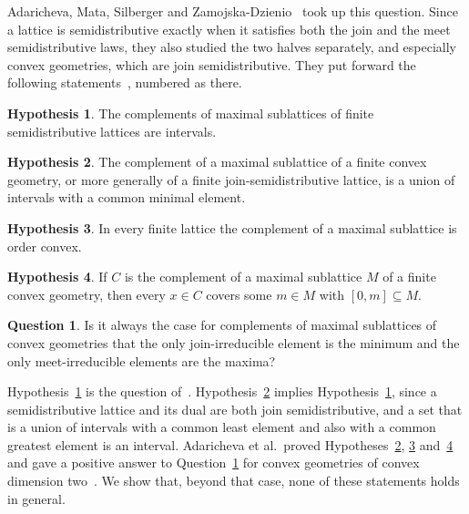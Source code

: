 \documentclass[11pt]{amsart}
\theoremstyle{definition}
\newtheorem{hypothesis}{Hypothesis}
\newtheorem{question}{Question}
\theoremstyle{remark}
\numberwithin{equation}{section}
\begin{document}
Adaricheva, Mata, Silberger and Zamojska-Dzienio~\cite{AMSZ} took up this question. Since a lattice is semidistributive exactly when it satisfies both the join and the meet semidistributive laws, they also studied the two halves separately, and especially convex geometries, which are join semidistributive. They put forward the following statements~\cite[pp.~2--4 and~25]{AMSZ}, numbered as there.

\begin{hypothesis}\label{h1}
The complements of maximal sublattices of finite semidistributive lattices are intervals.
\end{hypothesis}

\begin{hypothesis}\label{h2}
The complement of a maximal sublattice of a finite convex geometry, or more generally of a finite join-semidistributive lattice, is a union of intervals with a common minimal element.
\end{hypothesis}

\begin{hypothesis}\label{h3}
In every finite lattice the complement of a maximal sublattice is order convex.
\end{hypothesis}

\begin{hypothesis}\label{h4}
If $C$ is the complement of a maximal sublattice $M$ of a finite convex geometry, then every $x\in C$ covers some $m\in M$ with $[0,m]\subseteq M$.
\end{hypothesis}

\setcounter{question}{1}%
\begin{question}\label{q2}
Is it always the case for complements of maximal sublattices of convex geometries that the only join-irreducible element is the minimum and the only meet-irreducible elements are the maxima?
\end{question}

Hypothesis~\ref{h1} is the question of~\cite{AFNS}. Hypothesis~\ref{h2} implies Hypothesis~\ref{h1}, since a semidistributive lattice and its dual are both join semidistributive, and a set that is a union of intervals with a common least element and also with a common greatest element is an interval. Adaricheva et al.\ proved Hypotheses~\ref{h2}, \ref{h3} and~\ref{h4} and gave a positive answer to Question~\ref{q2} for convex geometries of convex dimension two~\cite[Section~6]{AMSZ}. We show that, beyond that case, none of these statements holds in general.
\end{document}
